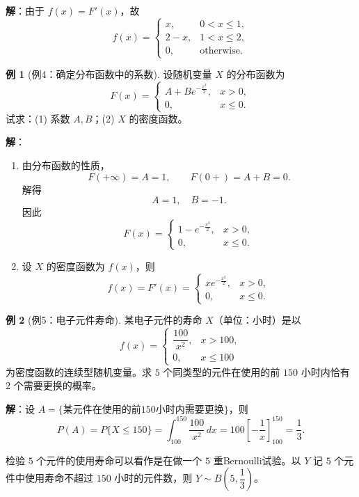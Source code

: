 \documentclass[11pt,a4paper]{report}
\theoremstyle{definition}
\newtheorem{example}{例}[chapter]
\begin{document}
\textbf{解}：由于 $f(x)=F'(x)$，故
\[
f(x) = \begin{cases}
x, & 0 < x \leq 1, \\[0.3em]
2-x, & 1 < x \leq 2, \\[0.3em]
0, & \text{otherwise}.
\end{cases}
\]

\begin{example}[例4：确定分布函数中的系数]
设随机变量 $X$ 的分布函数为
\[
F(x) = \begin{cases}
A+Be^{-\frac{x^2}{2}}, & x > 0, \\[0.3em]
0, & x \leq 0.
\end{cases}
\]
试求：(1) 系数 $A,B$；(2) $X$ 的密度函数。
\end{example}

\textbf{解}：
\begin{enumerate}[label=(\arabic*),leftmargin=2em]
    \item 由分布函数的性质，
    \[
    F(+\infty) = A = 1, \qquad F(0+) = A+B = 0.
    \]
    解得
    \[
    \boxed{A=1,\quad B=-1}.
    \]
    因此
    \[
    F(x) = \begin{cases}
    1-e^{-\frac{x^2}{2}}, & x > 0, \\[0.3em]
    0, & x \leq 0.
    \end{cases}
    \]
    
    \item 设 $X$ 的密度函数为 $f(x)$，则
    \[
    f(x) = F'(x) = \begin{cases}
    xe^{-\frac{x^2}{2}}, & x > 0, \\[0.3em]
    0, & x \leq 0.
    \end{cases}
    \]
\end{enumerate}

\begin{example}[例5：电子元件寿命]
某电子元件的寿命 $X$（单位：小时）是以
\[
f(x) = \begin{cases}
\dfrac{100}{x^2}, & x > 100, \\[0.5em]
0, & x \leq 100
\end{cases}
\]
为密度函数的连续型随机变量。求 $5$ 个同类型的元件在使用的前 $150$ 小时内恰有 $2$ 个需要更换的概率。
\end{example}

\textbf{解}：设 $A=\{\text{某元件在使用的前150小时内需要更换}\}$，则
\[
P(A) = P\{X \leq 150\} = \int_{100}^{150} \frac{100}{x^2}\,dx = 100\left[-\frac{1}{x}\right]_{100}^{150} = \frac{1}{3}.
\]

检验 $5$ 个元件的使用寿命可以看作是在做一个 $5$ 重Bernoulli试验。以 $Y$ 记 $5$ 个元件中使用寿命不超过 $150$ 小时的元件数，则 $Y \sim B\left(5,\dfrac{1}{3}\right)$。
\end{document}
